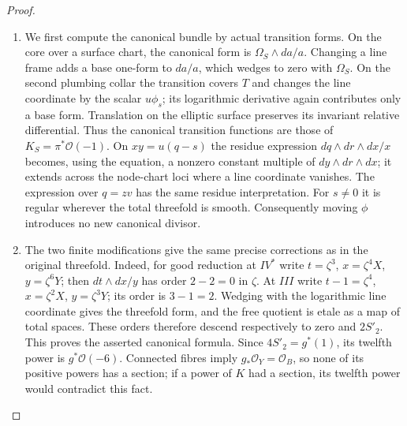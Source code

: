 \begin{proof}
\begin{enumerate}[label=\arabic*.,leftmargin=*]
\item We first compute the canonical bundle by actual transition forms.
On the core over a surface chart, the canonical form is
$\Omega_S\wedge da/a$. Changing a line frame adds a base one-form
to $da/a$, which wedges to zero with $\Omega_S$. On the second
plumbing collar the transition covers $T$ and changes the line
coordinate by the scalar $u\phi_s$; its logarithmic derivative
again contributes only a base form. Translation on the elliptic
surface preserves its invariant relative differential. Thus the
canonical transition functions are those of $K_S=\pi^*\mathcal O(-1)$.
On $xy=u(q-s)$ the residue expression
$dq\wedge dr\wedge dx/x$ becomes, using the equation,
a nonzero constant multiple of $dy\wedge dr\wedge dx$; it extends
across the node-chart loci where a line coordinate vanishes.
The expression over $q=zv$ has the same residue interpretation.
For $s\ne0$ it is regular wherever the total threefold is smooth.
Consequently moving $\phi$ introduces no new canonical divisor.

\item The two finite modifications give the same precise corrections as
in the original threefold. Indeed, for good reduction at $IV^*$
write $t=\zeta^3$, $x=\zeta^4X$, $y=\zeta^6Y$; then
$dt\wedge dx/y$ has order $2-2=0$ in $\zeta$. At $III$ write
$t-1=\zeta^4$, $x=\zeta^2X$, $y=\zeta^3Y$; its order is
$3-1=2$. Wedging with the logarithmic line coordinate gives the
threefold form, and the free quotient is etale as a map of total
spaces. These orders therefore descend respectively to zero and
$2S'_2$. This proves the asserted canonical formula. Since
$4S'_2=g^*(1)$, its twelfth power is $g^*\mathcal O(-6)$.
Connected fibres imply $g_*\mathcal O_Y=\mathcal O_B$, so none of
its positive powers has a section; if a power of $K$ had a section,
its twelfth power would contradict this fact.


\end{enumerate}
\end{proof}
